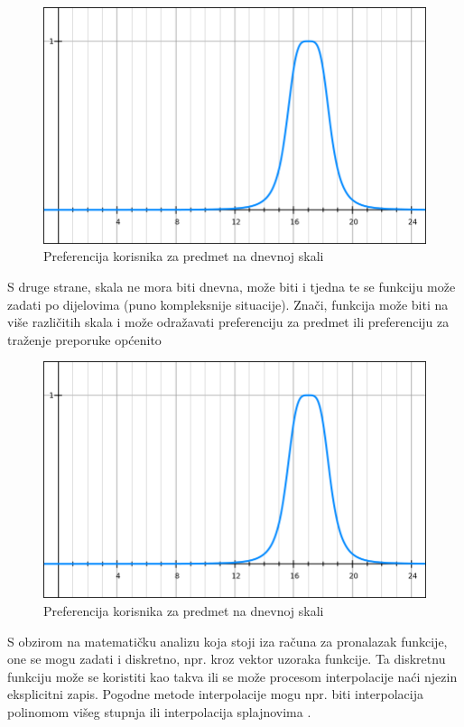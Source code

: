 \documentclass[times, utf8, diplomski, numeric]{fer}
\begin{document}
\begin{figure}[htb]
	\centering
	\includegraphics[width=12cm]{images/zvonolika1.png}
	\caption{Preferencija korisnika za predmet na dnevnoj skali}
	\label{fig:Gauss1}
\end{figure}

S druge strane, skala ne mora biti dnevna, može biti i tjedna te se funkciju
može zadati po dijelovima (puno kompleksnije situacije). %
Znači, funkcija može biti na više različitih skala i može odražavati
preferenciju za predmet ili preferenciju za traženje preporuke općenito

\begin{figure}[htb]
	\centering
	\includegraphics[width=12cm]{images/zvonolika1.png}
	\caption{Preferencija korisnika za predmet na dnevnoj skali}
	\label{fig:Gauss2}
\end{figure}

S obzirom na matematičku analizu koja stoji iza računa za pronalazak funkcije,
one se mogu zadati i diskretno, npr. kroz vektor uzoraka funkcije. Ta diskretnu
funkciju može se koristiti kao takva ili se može procesom interpolacije naći
njezin eksplicitni zapis. Pogodne metode interpolacije mogu npr. biti
interpolacija polinomom višeg stupnja ili interpolacija splajnovima
.
\end{document}
